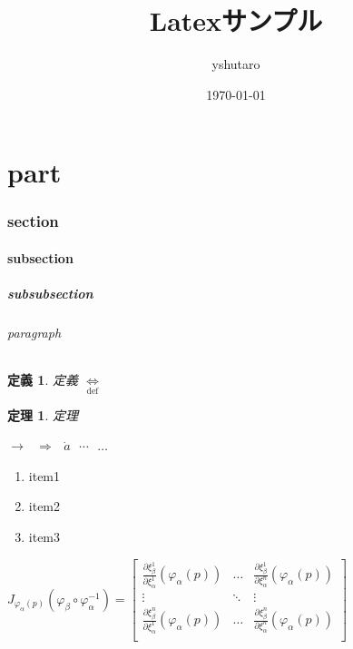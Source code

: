 \documentclass[a4paper,11pt]{jsarticle}
\newtheorem{dfn}{定義}
\newtheorem{thm}{定理}
\begin{document}
\title{Latexサンプル}
\author{yshutaro}
\date{\today}
\maketitle


\part{part}
\section{section}
\subsection{subsection}
\subsubsection{subsubsection}
\paragraph{paragraph}

\begin{dfn}
定義
$ \underset{\text{def}}\Leftrightarrow $
\end{dfn}
\begin{thm}
定理
\end{thm}


$ \rightarrow $ \(\)
$ \Rightarrow $ \(\)
$\dot{a}$ \(\)
$\dotsb$ \(\)
$\dots$ \(\)

\begin{enumerate}[M1]
  \item item1
  \item item2
  \item item3
\end{enumerate}

\begin{math}
  J_{\varphi_\alpha(p)}(\varphi_\beta \circ \varphi_\alpha^{-1}) = \left[
    \begin{array}{rrr}
      \frac{\partial \xi_\beta^1}{\partial \xi_\alpha^1}(\varphi_\alpha(p)) & \dots & \frac{\partial \xi_\beta^1}{\partial \xi_\alpha^n}(\varphi_\alpha(p))  \\
      \vdots & \ddots & \vdots \\
      \frac{\partial \xi_\beta^n}{\partial \xi_\alpha^1}(\varphi_\alpha(p)) & \dots & \frac{\partial \xi_\beta^n}{\partial \xi_\alpha^n}(\varphi_\alpha(p))  \\
    \end{array}
  \right]
\end{math}
\end{document}
